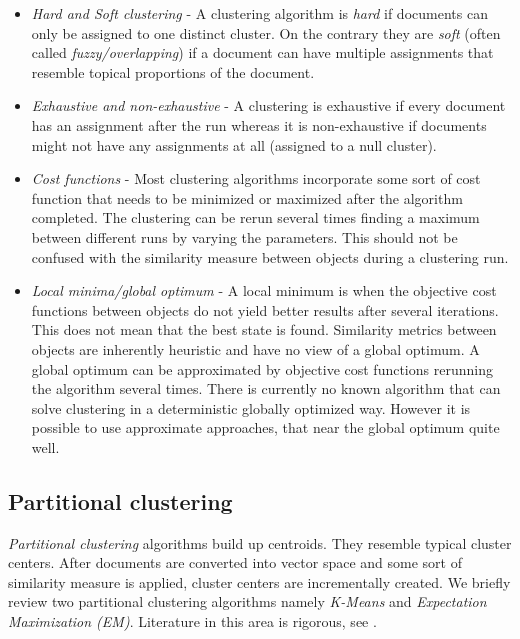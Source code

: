   \begin{itemize}
    \item \emph{Hard and Soft clustering} - A clustering algorithm is \emph{hard} if documents can only be assigned to one distinct cluster. On the contrary they are \emph{soft} (often called \emph{fuzzy/overlapping}) if a document can have multiple assignments that resemble topical proportions of the document.
    \item \emph{Exhaustive and non-exhaustive} - A clustering is exhaustive if every document has an assignment after the run whereas it is non-exhaustive if documents might not have any assignments at all (assigned to a null cluster).
    \item \emph{Cost functions} - Most clustering algorithms incorporate some sort of cost function that needs to be minimized or maximized after the algorithm completed. The clustering can be rerun several times finding a maximum between different runs by varying the parameters. This should not be confused with the similarity measure between objects during a clustering run.
    \item \emph{Local minima/global optimum} - A local minimum is when the objective cost functions between objects do not yield better results after several iterations. This does not mean that the best state is found. Similarity metrics between objects are inherently heuristic and have no view of a global optimum. A global optimum can be approximated by objective cost functions rerunning the algorithm several times. There is currently no known algorithm that can solve clustering in a deterministic globally optimized way. However it is possible to use approximate approaches, that near the global optimum quite well.
  \end{itemize}

  \subsection{Partitional clustering}
  \label{sec:partitional}

    \emph{Partitional clustering} algorithms build up centroids. They resemble typical cluster centers. After documents are converted into vector space and some sort of similarity measure is applied, cluster centers are incrementally created. We briefly review two partitional clustering algorithms namely \emph{K-Means} and \emph{Expectation Maximization (EM)}. Literature in this area is rigorous, see \cite{ClusteringBooAggarwalk2013, NextFrontierClustering2013, IRBookStanford2008}.

